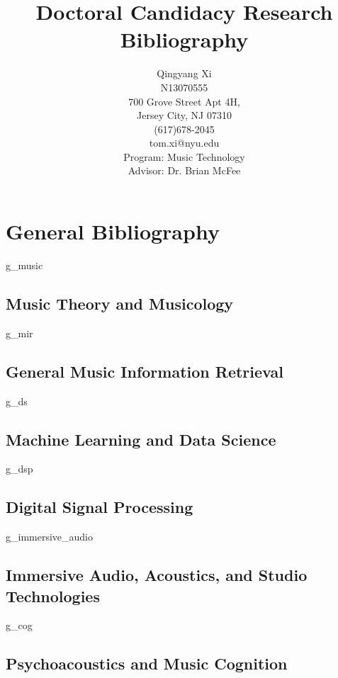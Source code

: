 \documentclass[11pt]{article}
\title{Doctoral Candidacy Research Bibliography}
\author{Qingyang Xi \\ N13070555 \\ 700 Grove Street Apt 4H,\\ Jersey City, NJ 07310 \\ (617)678-2045 \\tom.xi@nyu.edu \\Program: Music Technology \\ Advisor: Dr. Brian McFee \\}
\begin{document}
\maketitle

\section{General Bibliography}

\begin{btSect}{g_music}
\subsection{Music Theory and Musicology}
\btPrintAll
\end{btSect}

\begin{btSect}{g_mir}
\subsection{General Music Information Retrieval}
\btPrintAll
\end{btSect}

\begin{btSect}{g_ds}
\subsection{Machine Learning and Data Science}
\btPrintAll
\end{btSect}

\begin{btSect}{g_dsp}
\subsection{Digital Signal Processing}
\btPrintAll
\end{btSect}

\begin{btSect}{g_immersive_audio}
\subsection{Immersive Audio, Acoustics, and Studio Technologies}
\btPrintAll
\end{btSect}

\begin{btSect}{g_cog}
\subsection{Psychoacoustics and Music Cognition}
\btPrintAll
\end{btSect}
\end{document}
